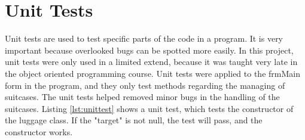 \section{Unit Tests}
\label{sec:unittests}
Unit tests are used to test specific parts of the code in a program. It is very important because overlooked bugs can be spotted more easily. In this project, unit tests were only used in a limited extend, because it was taught very late in the object oriented programming course. Unit tests were applied to the frmMain form in the program, and they only test methods regarding the managing of suitcases. The unit tests helped removed minor bugs in the handling of the suitcases.
Listing \ref{lst:unittest} shows a unit test, which tests the constructor of the luggage class. If the "target" is not null, the test will pass, and the constructor works. 